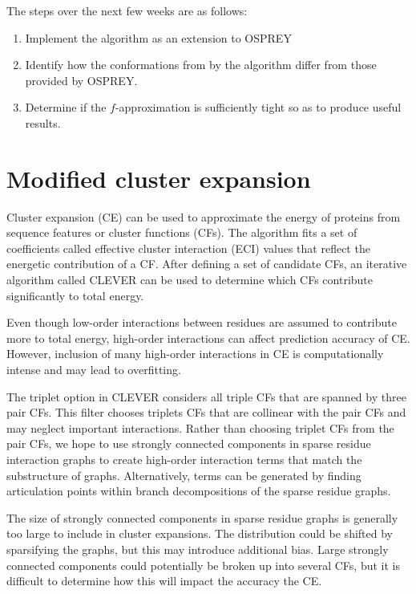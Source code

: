 \documentclass[11pt]{article}
\begin{document}
	The steps over the next few weeks are as follows:
	\begin{enumerate}
		\item Implement the algorithm as an extension to OSPREY

		\item Identify how the conformations from by the algorithm differ from 
		those provided by OSPREY. 
		
		\item Determine if the $f$-approximation is sufficiently tight so as to
		produce useful results. 
	\end{enumerate} 
	
		\section{Modified cluster expansion}
		Cluster expansion (CE) can be used to approximate the energy of proteins from sequence features or cluster functions (CFs).  The algorithm fits a set of coefficients called effective cluster interaction (ECI) values that reflect the energetic contribution of a CF.  After defining a set of candidate CFs, an iterative algorithm called CLEVER can be used to determine which CFs contribute significantly to total energy.  
		
		Even though low-order interactions between residues are assumed to contribute more to total energy, high-order interactions can affect prediction accuracy of CE. \cite{Grigoryan06}  However, inclusion of many high-order interactions in CE is computationally intense and may lead to overfitting. 
		
		 The triplet option in CLEVER considers all triple CFs that are spanned by three pair CFs. \cite{Clever}  This filter chooses triplets CFs that are collinear with the pair CFs and may neglect important interactions. Rather than choosing triplet CFs from the pair CFs, we hope to use strongly connected components in sparse residue interaction graphs to create high-order interaction terms that match the substructure of graphs.  Alternatively, terms can be generated by finding articulation points within branch decompositions of the sparse residue graphs.  
		 
		 The size of strongly connected components in sparse residue graphs is generally too large to include in cluster expansions. The distribution could be shifted by sparsifying the graphs, but this may introduce additional bias.  Large strongly connected components could potentially be broken up into several CFs, but it is difficult to determine how this will impact the accuracy the CE.
		 
\end{document}
